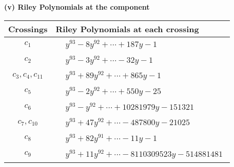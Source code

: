 \documentclass[1p]{elsarticle_modified}
\theoremstyle{definition}
\begin{document}
\newpage\renewcommand{\arraystretch}{1}
\flushleft \textbf{(v) Riley Polynomials at the component}\newline \\
\begin{tabular}{m{50pt}|m{274pt}}
Crossings & \hspace{64pt}Riley Polynomials at each crossing \\
\hline $$\begin{aligned}c_{1}\end{aligned}$$&$\begin{aligned}
&y^{93}-8 y^{92}+\cdots+187 y-1
\end{aligned}$\\
\hline $$\begin{aligned}c_{2}\end{aligned}$$&$\begin{aligned}
&y^{93}-3 y^{92}+\cdots-32 y-1
\end{aligned}$\\
\hline $$\begin{aligned}c_{3},c_{4},c_{11}\end{aligned}$$&$\begin{aligned}
&y^{93}+89 y^{92}+\cdots+865 y-1
\end{aligned}$\\
\hline $$\begin{aligned}c_{5}\end{aligned}$$&$\begin{aligned}
&y^{93}-2 y^{92}+\cdots+550 y-25
\end{aligned}$\\
\hline $$\begin{aligned}c_{6}\end{aligned}$$&$\begin{aligned}
&y^{93}- y^{92}+\cdots+10281979 y-151321
\end{aligned}$\\
\hline $$\begin{aligned}c_{7},c_{10}\end{aligned}$$&$\begin{aligned}
&y^{93}+47 y^{92}+\cdots-487800 y-21025
\end{aligned}$\\
\hline $$\begin{aligned}c_{8}\end{aligned}$$&$\begin{aligned}
&y^{93}+82 y^{91}+\cdots-11 y-1
\end{aligned}$\\
\hline $$\begin{aligned}c_{9}\end{aligned}$$&$\begin{aligned}
&y^{93}+11 y^{92}+\cdots-8110309523 y-514881481
\end{aligned}$\\
\hline
\end{tabular}\\~\\
\end{document}
